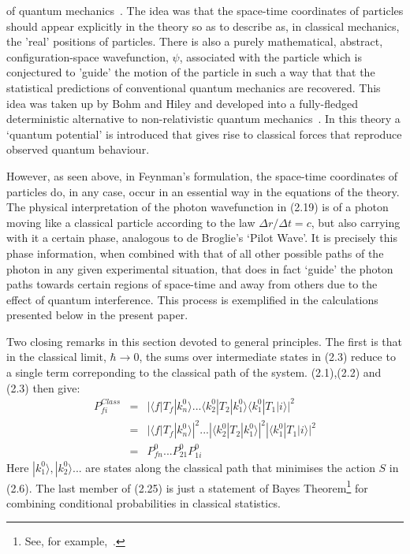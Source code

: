 \documentclass [12pt]{article}
\begin{document}
{  of quantum mechanics~\cite{DeBroglie2}. The idea was that the space-time coordinates of
   particles should appear explicitly in the theory so as to describe as, in classical 
   mechanics, the 'real' positions of particles. There is also a purely mathematical, 
   abstract, configuration-space wavefunction, $\psi$, associated with the particle which is
  conjectured to 'guide' the motion of the particle in such a way that that the statistical
  predictions of conventional quantum mechanics are recovered. This idea was taken up by
  Bohm and Hiley and developed into a fully-fledged deterministic alternative to
  non-relativistic quantum mechanics~\cite{BH}. In this theory a `quantum potential'
  is introduced that gives rise to classical forces that reproduce observed quantum
  behaviour.
  \par However, as seen above, in Feynman's formulation, the space-time
  coordinates of particles do, in any case, occur in an essential way in the 
  equations of the theory. The physical interpretation of the photon wavefunction
  in (2.19) is of a photon moving like a classical particle according to the law
  $\Delta r/\Delta t = c$, but also carrying with it a certain phase, analogous to
 de Broglie's `Pilot Wave'. It is precisely this phase information, when
  combined with that of all other possible paths of the photon in any given 
  experimental situation, that does in fact `guide' the photon paths towards certain 
  regions of space-time and away from others due to the effect of quantum
  interference. This process is exemplified in the calculations presented
  below in the present paper.
  \par Two closing remarks in this section devoted to general principles.
   The first is that in the classical limit, $\hbar \rightarrow 0$, the sums over intermediate
  states in (2.3) reduce to a single term correponding to the classical path of the system.
  (2.1),(2.2) and (2.3) then give:
   \begin{eqnarray}
    P_{fi}^{Class} & = & |\langle f|T_f|k_n^0 \rangle ...\langle k_2^0|T_2|k_1^0 \rangle
                   \langle k_1^0|T_1|i \rangle|^2  \nonumber \\
                   & = & |\langle f|T_f|k_n^0 \rangle|^2...|\langle k_2^0|T_2|k_1^0 \rangle|^2
                         |\langle k_1^0|T_1|i \rangle|^2  \nonumber \\
                   & = & P^0_{fn}... P^0_{21} P^0_{1i}                     
  \end{eqnarray} 
   Here $|k_1^0 \rangle, |k_2^0\rangle ...$ are states along the classical path that minimises the action $S$ in
   (2.6). The last member of (2.25) is just a statement of Bayes Theorem\footnote{See, for example,~\cite{Bayes}.}
    for combining conditional
  probabilities in classical statistics.

}
\end{document}
